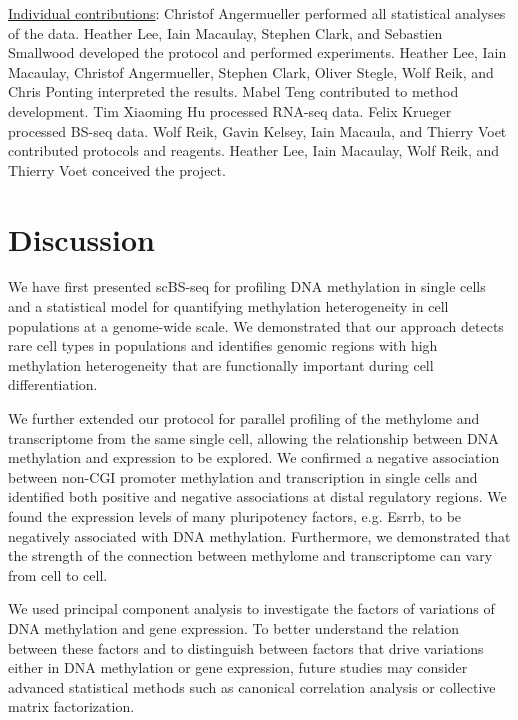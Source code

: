 \begin{center}
\begin{minipage}{.9\linewidth}
\underline{Individual contributions}: Christof Angermueller performed all statistical analyses of the data. Heather Lee, Iain Macaulay, Stephen Clark, and Sebastien Smallwood developed the protocol and performed experiments. Heather Lee, Iain Macaulay, Christof Angermueller, Stephen Clark, Oliver Stegle, Wolf Reik, and Chris Ponting interpreted the results. Mabel Teng contributed to method development. Tim Xiaoming Hu processed RNA-seq data. Felix Krueger processed BS-seq data. Wolf Reik, Gavin Kelsey, Iain Macaula, and Thierry Voet contributed protocols and reagents. Heather Lee, Iain Macaulay, Wolf Reik, and Thierry Voet conceived the project.
\end{minipage}
\end{center}





\section{Discussion}

We have first presented scBS-seq for profiling DNA methylation in single cells and a statistical model for quantifying methylation heterogeneity in cell populations at a genome-wide scale. We demonstrated that our approach detects rare cell types in populations and identifies genomic regions with high methylation heterogeneity that are functionally important during cell differentiation.

We further extended our protocol for parallel profiling of the methylome and transcriptome from the same single cell, allowing the relationship between DNA methylation and expression to be explored. We confirmed a negative association between non-CGI promoter methylation and transcription in single cells and identified both positive and negative associations at distal regulatory regions. We found the expression levels of many pluripotency factors, e.g. Esrrb, to be negatively associated with DNA methylation. Furthermore, we demonstrated that the strength of the connection between methylome and transcriptome can vary from cell to cell.

We used principal component analysis to investigate the factors of variations of DNA methylation and gene expression. To better understand the relation between these factors and to distinguish between factors that drive variations either in DNA methylation or gene expression, future studies may consider advanced statistical methods such as canonical correlation analysis or collective matrix factorization.

